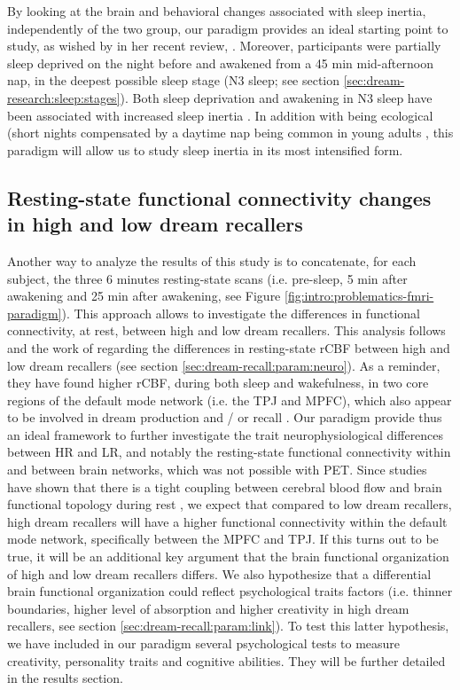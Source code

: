 By looking at the brain and behavioral changes associated with sleep inertia, independently of the two group, our paradigm provides an ideal starting point to study, as wished by \citet{trotti_waking_2016} in her recent review, . Moreover, participants were partially sleep deprived on the night before and awakened from a 45 min mid-afternoon nap, in the deepest possible sleep stage (N3 sleep; see section \ref{sec:dream-research:sleep:stages}). Both sleep deprivation and awakening in N3 sleep have been associated with increased sleep inertia \citep{tassi_sleep_2000}. In addition with being ecological (short nights compensated by a daytime nap being common in young adults \citep{faraut_napping:_2016}, this paradigm will allow us to study sleep inertia in its most intensified form.

\subsection{Resting-state functional connectivity changes in high and low dream recallers}
\label{sec:problematic:inertia:resting-drf}

Another way to analyze the results of this study is to concatenate, for each subject, the three 6 minutes resting-state scans (i.e. pre-sleep, 5 min after awakening and 25 min after awakening, see Figure \ref{fig:intro:problematics-fmri-paradigm}). This approach allows to investigate the differences in functional connectivity, at rest, between high and low dream recallers. This analysis follows and the work of \citet{eichenlaub_resting_2014} regarding the differences in resting-state rCBF between high and low dream recallers (see section \ref{sec:dream-recall:param:neuro}). As a reminder, they have found higher rCBF, during both sleep and wakefulness, in two core regions of the default mode network (i.e. the TPJ and MPFC), which also appear to be involved in dream production and / or recall \citep{solms_neuropsychology_1997}. Our paradigm provide thus an ideal framework to further investigate the trait neurophysiological differences between HR and LR, and notably the resting-state functional connectivity within and between brain networks, which was not possible with PET. Since studies have shown that there is a tight coupling between cerebral blood flow and brain functional topology during rest \citep{liang_coupling_2013}, we expect that compared to low dream recallers, high dream recallers will have a higher functional connectivity within the default mode network, specifically between the MPFC and TPJ. If this turns out to be true, it will be an additional key argument that the brain functional organization of high and low dream recallers differs. We also hypothesize that a differential brain functional organization could reflect psychological traits factors (i.e. thinner boundaries, higher level of absorption and higher creativity in high dream recallers, see section \ref{sec:dream-recall:param:link}). To test this latter hypothesis, we have included in our paradigm several psychological tests to measure creativity, personality traits and cognitive abilities. They will be further detailed in the results section.

